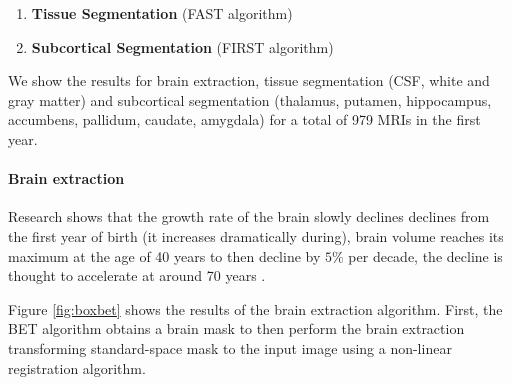 \documentclass[11pt]{article}
\theoremstyle{definition}
\theoremstyle{remark}
\begin{document}
\begin{enumerate}
  \item \textbf{Tissue Segmentation} (FAST algorithm)
  \item \textbf{Subcortical Segmentation} (FIRST algorithm)
\end{enumerate}

We show the results for brain extraction, tissue segmentation (CSF, white and gray matter) and subcortical segmentation (thalamus, putamen, hippocampus, accumbens, pallidum, caudate, amygdala) for a total of 979 MRIs in the first year. 

\paragraph*{Brain extraction}

Research shows that the growth rate of the brain slowly declines declines from the first year of birth (it increases dramatically during), brain volume reaches its maximum at the age of 40 years to then decline by $5\%$ per decade, the decline is thought to accelerate at around 70 years \cite{peters2006ageing}.

Figure \ref{fig:boxbet} shows the results of the brain extraction algorithm. First, the BET algorithm obtains a brain mask to then perform the brain extraction transforming standard-space mask to the input image using a non-linear registration algorithm.
\end{document}
